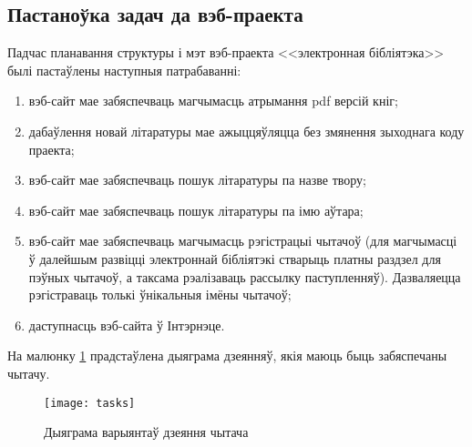 \subsection{Пастаноўка задач да вэб-праекта}

Падчас планавання структуры і мэт вэб-праекта <<электронная бібліятэка>> былі пастаўлены
наступныя патрабаванні:
\begin{enumerate}
    \item вэб-сайт мае забяспечваць магчымасць атрымання pdf версій кніг;
    \item дабаўлення новай літаратуры мае ажыццяўляцца без змянення зыходнага коду праекта;
    \item вэб-сайт мае забяспечваць пошук літаратуры па назве твору;
    \item вэб-сайт мае забяспечваць пошук літаратуры па імю аўтара;
    \item вэб-сайт мае забяспечваць магчымасць рэгістрацыі чытачоў (для магчымасці ў далейшым
          развіцці электроннай бібліятэкі стварыць платны раздзел для пэўных чытачоў, а таксама
          рэалізаваць рассылку паступленняў). Дазваляецца рэгістраваць толькі ўнікальныя імёны чытачоў;
    \item даступнасць вэб-сайта ў Інтэрнэце.
\end{enumerate}

На малюнку \ref{img: tasks} прадстаўлена дыяграма дзеянняў, якія маюць быць забяспечаны чытачу.

\begin{figure}[h!]
    \centering
    \texttt{[image: tasks]}
    \vspace{-2.5\baselineskip}
    \caption{Дыяграма варыянтаў дзеяння чытача}
    \label{img: tasks} 
\end{figure}
